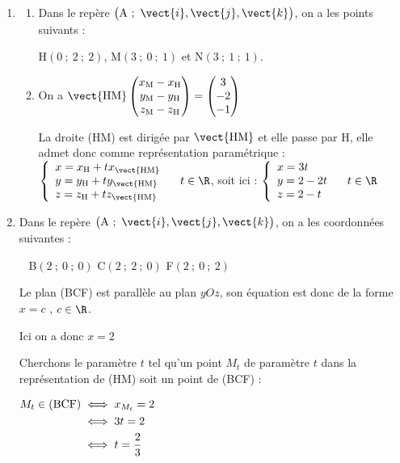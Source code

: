 
\begin{enumerate}
\item
	\begin{enumerate}
		\item Dans le repère $\big(\mathrm{A}~;~\vect{i},\vect{j},\vect{k}\big)$, on a les points suivants :

H$(0~;~2~;~2)$,  M$ (3~;~0~;~1) $ et N$(3~;~1~;~1)$. \hfill

\item On a  $\vect{\mathrm{HM}}\begin{pmatrix} x_\mathrm{M}-x_\mathrm{H}\\y_\mathrm{M}-y_\mathrm{H}\\z_\mathrm{M}-z_\mathrm{H} \end{pmatrix} = \begin{pmatrix} 3\\-2\\-1\end{pmatrix}$

La droite (HM) est dirigée par $\vect{\mathrm{HM}}$ et elle passe par H, elle admet donc comme représentation paramétrique : $ \left\{\begin{array}{l} x=x_\mathrm{H} + tx_{\vect{\mathrm{HM}}}\\y=y_\mathrm{H} + ty_{\vect{\mathrm{HM}}}\\z=z_\mathrm{H} + tz_{\vect{\mathrm{HM}}} \end{array}\right. \quad t \in \R $, soit ici : $ \left\{\begin{array}{l} x=3t\\y=2 -2 t\\z=2-t \end{array}\right. \quad t \in \R $
	\end{enumerate}
\item  Dans le repère $\big(\mathrm{A}~;~\vect{i},\vect{j},\vect{k}\big)$, on a les coordonnées suivantes :

\hfill~ B$(2~;~0~;~0)$ \hfill C$ (2~;~2~;~0) $ \hfill F$(2~;~0~;~2)$ \hfill

Le plan (BCF) est parallèle au plan $yOz$, son équation est donc de la forme $x=c$ , $c\in\R$.

Ici on a donc $x=2$

Cherchons le paramètre $t$ tel qu'un point $M_t$ de paramètre $t$ dans la représentation de (HM) soit un point de (BCF) :

	$\aligned M_t \in (\mathrm{BCF}) &\iff x_{M_t} = 2\\
	&\iff 3t=2\\
	&\iff t = \dfrac{2}{3}\\ \endaligned$


\end{enumerate}
